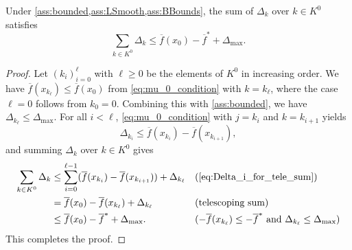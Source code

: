 \documentclass[journal_revised_MPC]{subfiles}
\begin{document}
\begin{lemma}\label{lem:delta_bound_and_sum}
    Under \cref{ass:bounded,ass:LSmooth,ass:BBounds}, the sum of $\Delta_k$ over $k \in K^0$ satisfies
    \begin{equation*}
        \sum_{k \in K^0} \Delta_k \le \overline{f}(x_0) - \overline{f}^* + \Delta_{\max}.
    \end{equation*}
\end{lemma}
\begin{proof}
    Let $(k_i)_{i=0}^{\ell}$ with $\ell \geq 0$ be the elements of $K^0$ in increasing order.
    We have $\overline{f}(x_{k_{\ell}}) \le \overline{f}(x_0)$ from \cref{eq:mu_0_condition} with $k=k_{\ell}$, where the case $\ell=0$ follows from $k_0=0$.
    Combining this with \cref{ass:bounded}, we have $\Delta_{k_{\ell}} \le \Delta_{\max}$.
    For all $i < \ell$, \cref{eq:mu_0_condition} with $j=k_i$ and $k=k_{i+1}$ yields
    \begin{equation}\label{eq:Delta_i_for_tele_sum}
        \Delta_{k_i} \leq \overline{f}(x_{k_i}) - \overline{f}(x_{k_{i+1}}),
    \end{equation}
    and summing $\Delta_{k}$ over $k \in K^0$ gives
    \begin{align*}
        \sum_{k \in K^0} \Delta_{k}
         & \le \sum_{i=0}^{\ell-1} (\overline{f}(x_{k_i}) - \overline{f}(x_{k_{i+1}})) + \Delta_{k_{\ell}} &  & (\text{\cref{eq:Delta_i_for_tele_sum}})                                                            \\
         & = \overline{f}(x_0) - \overline{f}(x_{k_{\ell}}) + \Delta_{k_{\ell}}                            &  & (\text{telescoping sum})                                                                           \\
         & \leq \overline{f}(x_0) - \overline{f}^* + \Delta_{\max}.                                        &  & (-\overline{f}(x_{k_{\ell}}) \le -\overline{f}^* \text{ and } \Delta_{k_{\ell}} \le \Delta_{\max})
    \end{align*}
    This completes the proof.
    \myQED
\end{proof}
\end{document}
